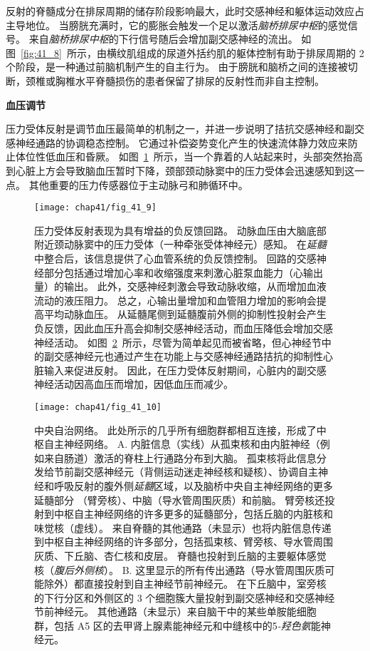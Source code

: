 反射的脊髓成分在排尿周期的储存阶段影响最大，此时交感神经和躯体运动效应占主导地位。
当膀胱充满时，它的膨胀会触发一个足以激活\textit{脑桥排尿中枢}的感觉信号。
来自\textit{脑桥排尿中枢}的下行信号随后会增加副交感神经的流出。
如图~\ref{fig:41_8}~所示，由横纹肌组成的尿道外括约肌的躯体控制有助于排尿周期的 2 个阶段，是一种通过前脑机制产生的自主行为。
由于膀胱和脑桥之间的连接被切断，颈椎或胸椎水平脊髓损伤的患者保留了排尿的反射性而非自主控制。


\textbf{血压调节}

压力受体反射是调节血压最简单的机制之一，并进一步说明了拮抗交感神经和副交感神经通路的协调稳态控制。
它通过补偿姿势变化产生的快速流体静力效应来防止体位性低血压和昏厥。
如图~\ref{fig:41_9}~所示，当一个靠着的人站起来时，头部突然抬高到心脏上方会导致脑血压暂时下降，颈部颈动脉窦中的压力受体会迅速感知到这一点。
其他重要的压力传感器位于主动脉弓和肺循环中。


\begin{figure}[htbp]
	\centering
	\texttt{[image: chap41/fig\_41\_9]}
	\caption{压力受体反射表现为具有增益的负反馈回路。
		动脉血压由大脑底部附近颈动脉窦中的压力受体（一种牵张受体神经元）感知。
		在\textit{延髓}中整合后，该信息提供了心血管系统的负反馈控制。
		回路的交感神经部分包括通过增加心率和收缩强度来刺激心脏泵血能力（心输出量）的输出。
		此外，交感神经刺激会导致动脉收缩，从而增加血液流动的液压阻力。
		总之，心输出量增加和血管阻力增加的影响会提高平均动脉血压。
		从延髓尾侧到延髓腹前外侧的抑制性投射会产生负反馈，因此血压升高会抑制交感神经活动，而血压降低会增加交感神经活动。
		如图~\ref{fig:41_10}~所示，尽管为简单起见而被省略，但心神经节中的副交感神经元也通过产生在功能上与交感神经通路拮抗的抑制性心脏输入来促进反射。
		因此，在压力受体反射期间，心脏内的副交感神经活动因高血压而增加，因低血压而减少。}
	\label{fig:41_9}
\end{figure}


\begin{figure}[htbp]
	\centering
	\texttt{[image: chap41/fig\_41\_10]}
	\caption{中央自治网络。
		此处所示的几乎所有细胞群都相互连接，形成了中枢自主神经网络。
		A. 内脏信息（实线）从孤束核和由内脏神经（例如来自肠道）激活的脊柱上行通路分布到大脑。
		孤束核将此信息分发给节前副交感神经元（背侧运动迷走神经核和疑核）、协调自主神经和呼吸反射的腹外侧\textit{延髓}区域，以及脑桥中央自主神经网络的更多延髓部分 （臂旁核）、中脑（导水管周围灰质）和前脑。
		臂旁核还投射到中枢自主神经网络的许多更多的延髓部分，包括丘脑的内脏核和味觉核（虚线）。
		来自脊髓的其他通路（未显示）也将内脏信息传递到中枢自主神经网络的许多部分，包括孤束核、臂旁核、导水管周围灰质、下丘脑、杏仁核和皮层。
		脊髓也投射到丘脑的主要躯体感觉核（\textit{腹后外侧核}）。
		B. 这里显示的所有传出通路（导水管周围灰质可能除外）都直接投射到自主神经节前神经元。
		在下丘脑中，室旁核的下行分区和外侧区的 3 个细胞簇大量投射到副交感神经和交感神经节前神经元。
		其他通路（未显示）来自脑干中的某些单胺能细胞群，包括 A5 区的去甲肾上腺素能神经元和中缝核中的5\textit{-羟色氨}能神经元。}
	\label{fig:41_10}
\end{figure}


